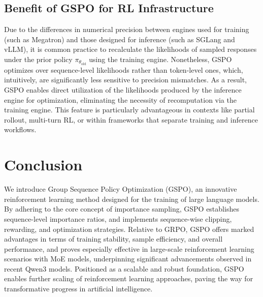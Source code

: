 \subsection{Benefit of GSPO for RL Infrastructure}

Due to the differences in numerical precision between engines used for training (such as Megatron) and those designed for inference (such as SGLang and vLLM), it is common practice to recalculate the likelihoods of sampled responses under the prior policy $\pi_{\theta_\text{old}}$ using the training engine. Nonetheless, GSPO optimizes over sequence-level likelihoods rather than token-level ones, which, intuitively, are significantly less sensitive to precision mismatches. As a result, GSPO enables direct utilization of the likelihoods produced by the inference engine for optimization, eliminating the necessity of recomputation via the training engine. This feature is particularly advantageous in contexts like partial rollout, multi-turn RL, or within frameworks that separate training and inference workflows.

\section{Conclusion}

We introduce Group Sequence Policy Optimization (GSPO), an innovative reinforcement learning method designed for the training of large language models. By adhering to the core concept of importance sampling, GSPO establishes sequence-level importance ratios, and implements sequence-wise clipping, rewarding, and optimization strategies. Relative to GRPO, GSPO offers marked advantages in terms of training stability, sample efficiency, and overall performance, and proves especially effective in large-scale reinforcement learning scenarios with MoE models, underpinning significant advancements observed in recent Qwen3 models. Positioned as a scalable and robust foundation, GSPO enables further scaling of reinforcement learning approaches, paving the way for transformative progress in artificial intelligence.

